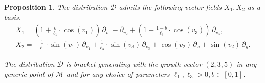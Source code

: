 \documentclass{amsart}
\theoremstyle{plain}
\newtheorem{proposition}[theorem]{Proposition}
\theoremstyle{definition}
\theoremstyle{remark}
\newcommand{\mc}[1]{\mathcal{#1}}
\begin{document}
\begin{proposition}
    The distribution $\mc{D}$ admits the following vector fields $X_1,X_2$ as a basis.
    \begin{equation}\label{generators}
    \begin{gathered}
        X_1 = \left( 1 + \frac{b}{\ell_1} \cdot \cos(v_1) \right)\, \partial_{v_1} - \partial_{v_2} + \left(1 + \frac{1-b}{\ell_3} \cdot \cos(v_3)\right)\, \partial_{v_3},\\
        X_2 = -\frac{1}{\ell_1} \cdot \sin(v_1)\, \partial_{v_1} + \frac{1}{\ell_3} \cdot \sin(v_3)\, \partial_{v_3} + \cos(v_2)\, \partial_{x} + \sin(v_2)\, \partial_{y}.
    \end{gathered}
    \end{equation}

    The distribution $\mc{D}$ is bracket-generating with the growth vector $(2,3,5)$ in any generic point of $\mc{M}$ and for any choice of parameters $\ell_1,\ell_3>0, b\in [0,1]$.
\end{proposition}
\end{document}
